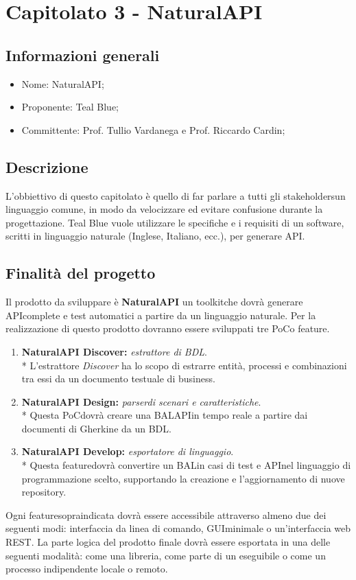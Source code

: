 \section{Capitolato 3 - NaturalAPI}
\subsection{Informazioni generali}
\begin{itemize}
	\item Nome: NaturalAPI;
	\item Proponente: Teal Blue;
	\item Committente: Prof. Tullio Vardanega e Prof. Riccardo Cardin;
\end{itemize}
\subsection{Descrizione}
L'obbiettivo di questo capitolato è quello di far parlare a tutti gli stakeholders\glosp un linguaggio comune, in modo da velocizzare ed evitare confusione durante la progettazione. Teal Blue vuole utilizzare le specifiche e i requisiti di un software, scritti in linguaggio naturale (Inglese, Italiano, ecc.), per generare API\glo.
\subsection{Finalità del progetto}
Il prodotto da sviluppare è \textbf{NaturalAPI} un toolkit\glosp che dovrà generare API\glosp complete e test automatici a partire da un linguaggio naturale. Per la realizzazione di questo prodotto dovranno essere sviluppati tre PoC\glosp o feature\glo.
\begin{enumerate}
	\item \textbf{NaturalAPI Discover: }\textit{estrattore di BDL\glo}. \\*
	L'estrattore \textit{Discover} ha lo scopo di estrarre entità, processi e combinazioni tra essi da un documento testuale di business.
	\item \textbf{NaturalAPI Design: }\textit{parser\glosp di scenari e caratteristiche}. \\*
	Questa PoC\glosp dovrà creare una BAL\glosp API\glosp in tempo reale a partire dai documenti di Gherkin\glosp e da un BDL\glo.
	\item \textbf{NaturalAPI Develop: }\textit{esportatore di linguaggio}. \\* 
	Questa feature\glosp dovrà convertire un BAL\glosp in casi di test e API\glosp nel linguaggio di programmazione scelto, supportando la creazione e l'aggiornamento di nuove repository\glo.
\end{enumerate} 
Ogni feature\glosp sopraindicata dovrà essere accessibile attraverso almeno due dei seguenti modi: interfaccia da linea di comando, GUI\glosp minimale o un'interfaccia web REST\glo.
La parte logica del prodotto finale dovrà essere esportata in una delle seguenti modalità: come una libreria, come parte di un eseguibile o come un processo indipendente locale o remoto.  


